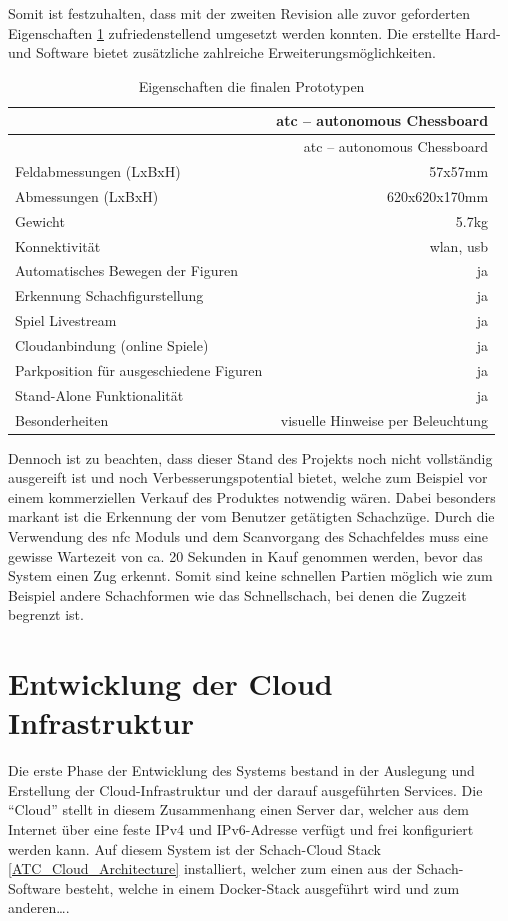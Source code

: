 Somit ist festzuhalten, dass mit der zweiten Revision alle zuvor
geforderten Eigenschaften \ref{finalfeaturesatc} zufriedenstellend
umgesetzt werden konnten. Die erstellte Hard- und Software bietet
zusätzliche zahlreiche Erweiterungsmöglichkeiten.

\begin{longtable}[]{@{}lr@{}}
\caption{Eigenschaften die finalen Prototypen
\label{finalfeaturesatc}}\tabularnewline
\toprule
& \gls{atc} -- autonomous Chessboard\tabularnewline
\midrule
\endfirsthead
\toprule
& \gls{atc} -- autonomous Chessboard\tabularnewline
\midrule
\endhead
Feldabmessungen (LxBxH) & 57x57mm\tabularnewline
Abmessungen (LxBxH) & 620x620x170mm\tabularnewline
Gewicht & 5.7kg\tabularnewline
Konnektivität & \gls{wlan}, \gls{usb}\tabularnewline
Automatisches Bewegen der Figuren & ja\tabularnewline
Erkennung Schachfigurstellung & ja\tabularnewline
Spiel Livestream & ja\tabularnewline
Cloudanbindung (online Spiele) & ja\tabularnewline
Parkposition für ausgeschiedene Figuren & ja\tabularnewline
Stand-Alone Funktionalität & ja\tabularnewline
Besonderheiten & visuelle Hinweise per Beleuchtung\tabularnewline
\bottomrule
\end{longtable}

Dennoch ist zu beachten, dass dieser Stand des Projekts noch nicht
vollständig ausgereift ist und noch Verbesserungspotential bietet,
welche zum Beispiel vor einem kommerziellen Verkauf des Produktes
notwendig wären. Dabei besonders markant ist die Erkennung der vom
Benutzer getätigten Schachzüge. Durch die Verwendung des \gls{nfc}
Moduls und dem Scanvorgang des Schachfeldes muss eine gewisse Wartezeit
von ca. 20 Sekunden in Kauf genommen werden, bevor das System einen Zug
erkennt. Somit sind keine schnellen Partien möglich wie zum Beispiel
andere Schachformen wie das Schnellschach, bei denen die Zugzeit
begrenzt ist.

\hypertarget{entwicklung-der-cloud-infrastruktur}{%
\chapter{Entwicklung der Cloud
Infrastruktur}\label{entwicklung-der-cloud-infrastruktur}}

Die erste Phase der Entwicklung des Systems bestand in der Auslegung und
Erstellung der Cloud-Infrastruktur und der darauf ausgeführten Services.
Die ``Cloud'' stellt in diesem Zusammenhang einen Server dar, welcher
aus dem Internet über eine feste IPv4 und IPv6-Adresse verfügt und frei
konfiguriert werden kann. Auf diesem System ist der Schach-Cloud Stack
\ref{ATC_Cloud_Architecture} installiert, welcher zum einen aus der
Schach-Software besteht, welche in einem Docker-Stack ausgeführt wird
und zum anderen\ldots{}.

